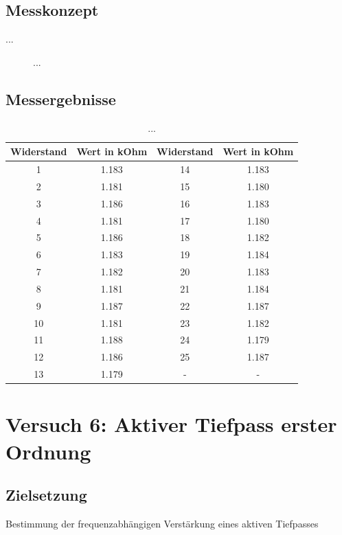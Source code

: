 \documentclass[a4paper,12pt]{article}
\begin{document}
\subsection{Messkonzept}
...

\begin{figure}[H]
    \centering
\caption{...}
\end{figure}


\subsection{Messergebnisse}
\begin{table}[H]
	\centering
	\begin{tabular}{|c|c|c|c|}
		\hline
		Widerstand & Wert in kOhm & Widerstand & Wert in kOhm \\
		\hline
		1 & 1.183 & 14 & 1.183 \\
		2 & 1.181 & 15 & 1.180 \\
		3 & 1.186 & 16 & 1.183 \\
		4 & 1.181 & 17 & 1.180 \\
		5 & 1.186 & 18 & 1.182 \\
		6 & 1.183 & 19 & 1.184 \\
		7 & 1.182 & 20 & 1.183 \\
		8 & 1.181 & 21 & 1.184 \\
		9 & 1.187 & 22 & 1.187 \\
		10 & 1.181 & 23 & 1.182 \\
		11 & 1.188 & 24 & 1.179 \\
		12 & 1.186 & 25 & 1.187 \\
		13 & 1.179 & - & - \\
		\hline
	\end{tabular}
	\caption{...}
\end{table}

\section{Versuch 6: Aktiver Tiefpass erster Ordnung}
\subsection{Zielsetzung}
Bestimmung der frequenzabhängigen Verstärkung eines aktiven Tiefpasses
\end{document}
